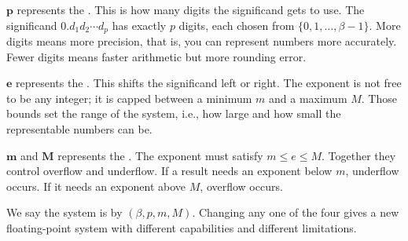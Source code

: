 \medskip
$\boldsymbol{p}$  represents the .
This is how many digits the significand gets to use.
The significand $0.d_1 d_2 \cdots d_p$ has exactly $p$ digits, each chosen
from $\{0, 1, \ldots, \beta - 1\}$.
More digits means more precision, that is, you can represent numbers more
accurately.
Fewer digits means faster arithmetic but more rounding error.

\medskip
$\boldsymbol{e}$  represents the .
This shifts the significand left or right.
The exponent is not free to be any integer; it is capped between a minimum
$m$ and a maximum $M$.
Those bounds set the range of the system, i.e., how large and how small the
representable numbers can be.

\medskip
$\boldsymbol{m}$ and $\boldsymbol{M}$  represents the .
The exponent must satisfy $m \leq e \leq M$.
Together they control overflow and underflow.
If a result needs an exponent below $m$, underflow occurs.
If it needs an exponent above $M$, overflow occurs.

\medskip
We say the system is  by
$(\beta, p, m, M)$.
Changing any one of the four gives a new floating-point system with different
capabilities and different limitations.

